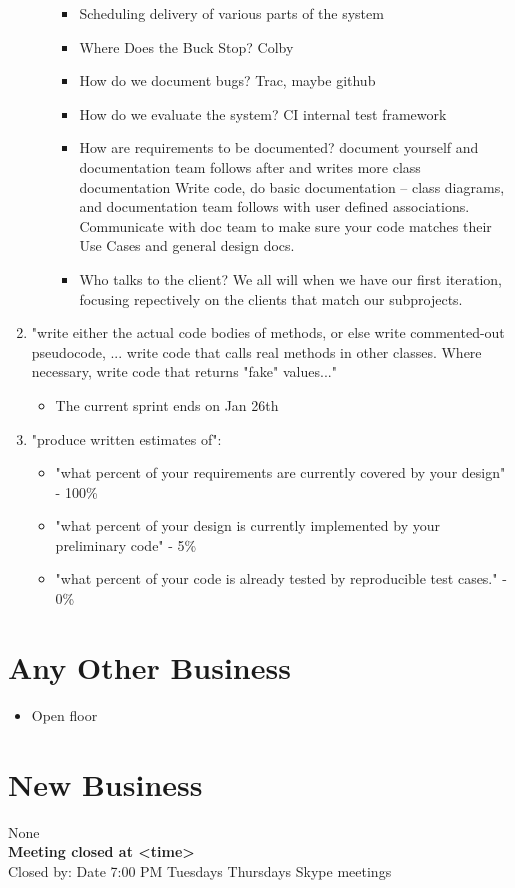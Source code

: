 \documentclass[12pt]{article}
\begin{document}
\begin{enumerate}
\begin{itemize}
\begin{itemize}
    \item Scheduling delivery of various parts of the system
    \item Where Does the Buck Stop? Colby
    \item How do we document bugs? Trac, maybe github
    \item How do we evaluate the system? CI internal test framework
    \item How are requirements to be documented? document yourself and documentation team follows after and writes more class documentation
    Write code, do basic documentation -- class diagrams, and documentation team follows with user defined associations. Communicate with doc
    team to make sure your code matches their Use Cases and general design docs.
    \item Who talks to the client? We all will when we have our first iteration, focusing repectively on the clients that match our subprojects.
   \end{itemize}
  \end{itemize}
 \item "write either the actual code bodies of methods, or else write commented-out pseudocode, ... write code that calls real methods in other classes. Where necessary, write code that returns "fake" values..."
 \begin{itemize}
  \item The current sprint ends on Jan 26th
 \end{itemize}
 \item "produce written estimates of":
 \begin{itemize}
  \item "what percent of your requirements are currently covered by your design" - 100\%
  \item "what percent of your design is currently implemented by your preliminary code" - 5\%
  \item "what percent of your code is already tested by reproducible test cases." - 0\%
 \end{itemize}
\end{enumerate}
 \section{Any Other Business}
 \begin{itemize}
 \item Open floor
\end{itemize}
\section{New Business}
None\\
\textbf{Meeting closed at <time>} \\
Closed by:
Date
7:00 PM Tuesdays Thursdays Skype meetings
\end{document}
